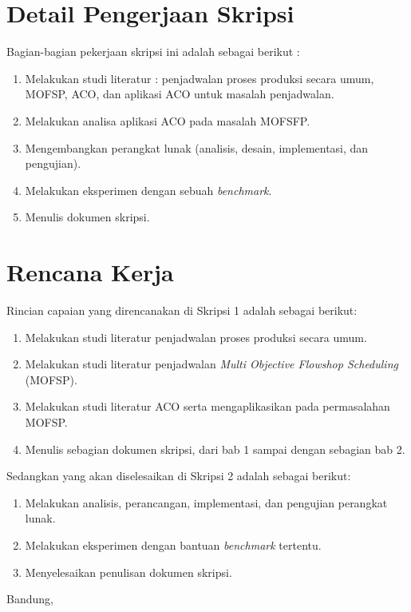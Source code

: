 \documentclass[a4paper,twoside]{article}
\begin{document}
\section{Detail Pengerjaan Skripsi}

Bagian-bagian pekerjaan skripsi ini adalah sebagai berikut :
	\begin{enumerate}
		\item Melakukan studi literatur : penjadwalan proses produksi secara umum, MOFSP, ACO, dan aplikasi ACO untuk masalah penjadwalan.
		\item Melakukan analisa aplikasi ACO pada masalah MOFSFP.
		\item Mengembangkan perangkat lunak (analisis, desain, implementasi, dan pengujian).
		\item Melakukan eksperimen dengan sebuah {\it benchmark}. 
		\item Menulis dokumen skripsi.
	\end{enumerate}

\section{Rencana Kerja}

Rincian capaian yang direncanakan di Skripsi 1 adalah sebagai berikut:
\begin{enumerate}
\item Melakukan studi literatur penjadwalan proses produksi secara umum.
\item Melakukan studi literatur penjadwalan {\it Multi Objective Flowshop Scheduling} (MOFSP).
\item Melakukan studi literatur ACO serta mengaplikasikan pada permasalahan MOFSP.
\item Menulis sebagian dokumen skripsi, dari bab 1 sampai dengan sebagian bab 2.

\end{enumerate}

Sedangkan yang akan diselesaikan di Skripsi 2 adalah sebagai berikut:
\begin{enumerate}
\item Melakukan analisis, perancangan, implementasi, dan pengujian perangkat lunak.
\item Melakukan eksperimen dengan bantuan {\it benchmark} tertentu.
\item Menyelesaikan penulisan dokumen skripsi.

\end{enumerate}

\newpage
\vspace{1cm}
\centering Bandung, \tanggal\\
\vspace{2cm} \nama \\ 
\vspace{1cm}
\end{document}
